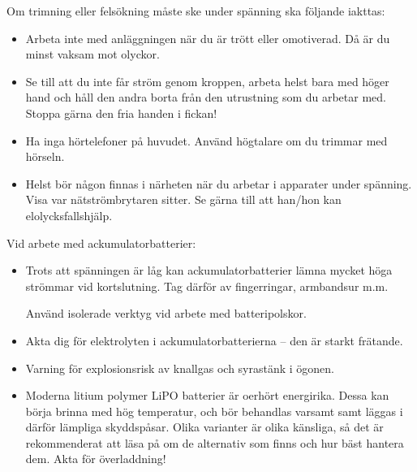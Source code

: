 Om trimning eller felsökning måste ske under spänning ska följande iakttas:
\begin{itemize}
\item Arbeta inte med anläggningen när du är trött eller omotiverad.
  Då är du minst vaksam mot olyckor.
\item Se till att du inte får ström genom kroppen, arbeta helst bara med höger
  hand och håll den andra borta från den utrustning som du arbetar med.
  Stoppa gärna den fria handen i fickan!
\item Ha inga hörtelefoner på huvudet.
  Använd högtalare om du trimmar med hörseln.
\item Helst bör någon finnas i närheten när du arbetar i apparater under
  spänning.
  Visa var nätströmbrytaren sitter.
  Se gärna till att han/hon kan elolycksfallshjälp.
\end{itemize}

Vid arbete med ackumulatorbatterier:
\begin{itemize}
\item Trots att spänningen är låg kan ackumulatorbatterier lämna
  mycket höga strömmar vid kortslutning.
  Tag därför av fingerringar, armbandsur m.m.

Använd isolerade verktyg vid arbete med batteripolskor.
\item Akta dig för elektrolyten i ackumulatorbatterierna -- den är
  starkt frätande.
\item Varning för explosionsrisk av knallgas och syrastänk i ögonen.
\item Moderna litium polymer LiPO batterier är oerhört energirika.
  Dessa kan börja brinna med hög temperatur, och bör behandlas varsamt samt
  läggas i därför lämpliga skyddspåsar.
  Olika varianter är olika känsliga, så det är rekommenderat att läsa på om
  de alternativ som finns och hur bäst hantera dem.
  Akta för överladdning!
\end{itemize}
